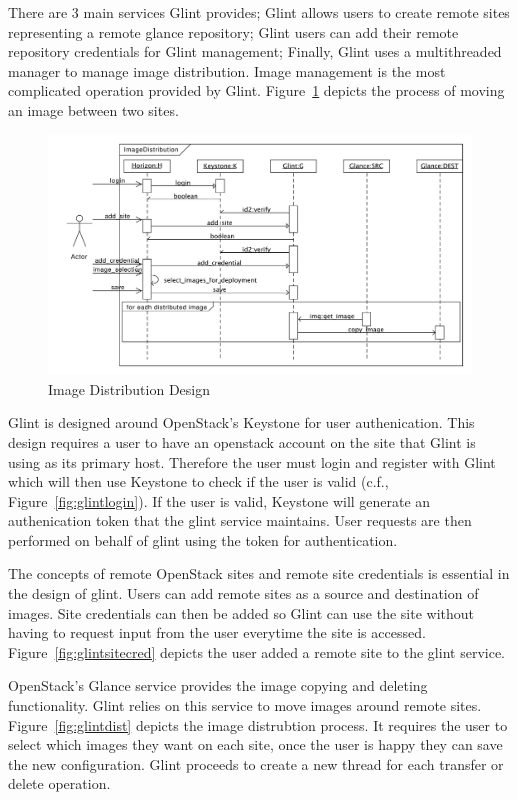 \documentclass[a4paper]{jpconf}
\begin{document}
There are 3 main services Glint provides; Glint allows users to create remote sites representing a remote glance repository; Glint users can add their remote repository credentials for Glint management; Finally, Glint uses a multithreaded manager to manage image distribution. Image management is the most complicated operation provided by Glint. Figure~\ref{fig:glintseqdiag} depicts the process of moving an image between two sites. 

\begin{figure}[h]
\begin{center}
\includegraphics[width=36pc]{images/glintseqdiag.pdf}
\caption{\label{fig:glintseqdiag}Image Distribution Design}
\end{center}
\end{figure}

Glint is designed around OpenStack's Keystone for user authenication. This design requires a user to have an openstack account on the site that Glint is using as its primary host. Therefore the user must login and register with Glint which will then use Keystone to check if the user is valid (c.f., Figure~\ref{fig:glintlogin}). If the user is valid, Keystone will generate an authenication token that the glint service maintains. User requests are then performed on behalf of glint using the token for authentication.

The concepts of remote OpenStack sites and remote site credentials is essential in the design of glint. Users can add remote sites as a source and destination of images. Site credentials can then be added so Glint can use the site without having to request input from the user everytime the site is accessed. Figure~\ref{fig:glintsitecred} depicts the user added a remote site to the glint service.

OpenStack's Glance service provides the image copying and deleting functionality. Glint relies on this service to move images around remote sites. Figure~\ref{fig:glintdist} depicts the image distrubtion process. It requires the user to select which images they want on each site, once the user is happy they can save the new configuration. Glint proceeds to create a new thread for each transfer or delete operation. 
\end{document}
